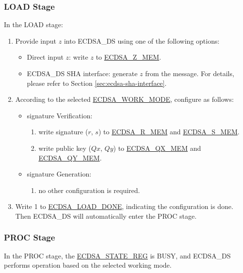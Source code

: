 \documentclass[main\_\_EN.tex]{subfiles}
\begin{document}
\subsubsection{LOAD Stage}
In the LOAD stage:

\begin{enumerate}
	\item Provide input $z$ into ECDSA\_DS using one of the following options:
	      \begin{itemize}
		      \item Direct input $z$: write $z$ to \hyperref[tab:ecdsa-memory]{ECDSA\_Z\_MEM}.
		      \item ECDSA\_DS SHA interface: generate $z$ from the message. For details, please refer to Section \ref{sec:ecdsa-sha-interface}.
	      \end{itemize}
	\item According to the selected \hyperref[fielddesc:ECDSAWORKMODE]{ECDSA\_WORK\_MODE}, configure as follows:
	      \begin{itemize}
		      \item signature Verification:
		            \begin{enumerate}
			            \item write signature ($r$, $s$) to \hyperref[tab:ecdsa-memory]{ECDSA\_R\_MEM} and \hyperref[tab:ecdsa-memory]{ECDSA\_S\_MEM}.
			            \item write public key ($Qx$, $Qy$) to \hyperref[tab:ecdsa-memory]{ECDSA\_QX\_MEM} and \hyperref[tab:ecdsa-memory]{ECDSA\_QY\_MEM}.
		            \end{enumerate}
		      \item signature Generation:
		            \begin{enumerate}
			            \item no other configuration is required.
		            \end{enumerate}
	      \end{itemize}
	\item Write 1 to \hyperref[fielddesc:ECDSALOADDONE]{ECDSA\_LOAD\_DONE}, indicating the configuration is done. Then ECDSA\_DS will automatically enter the PROC stage.
\end{enumerate}

\subsubsection{PROC Stage}

In the PROC stage, the \hyperref[regdesc:ECDSASTATEREG]{ECDSA\_STATE\_REG} is BUSY, and ECDSA\_DS performs operation based on the selected working mode.
\end{document}
